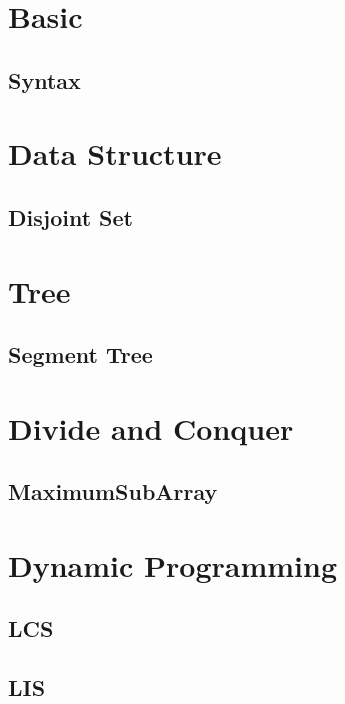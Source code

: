 \section{Basic}

\subsection{Syntax}

\section{Data Structure}

\subsection{Disjoint Set}

\section{Tree}

\subsection{Segment Tree}

\section{Divide and Conquer}

\subsection{MaximumSubArray}

\section{Dynamic Programming}

\subsection{LCS}


\subsection{LIS}

